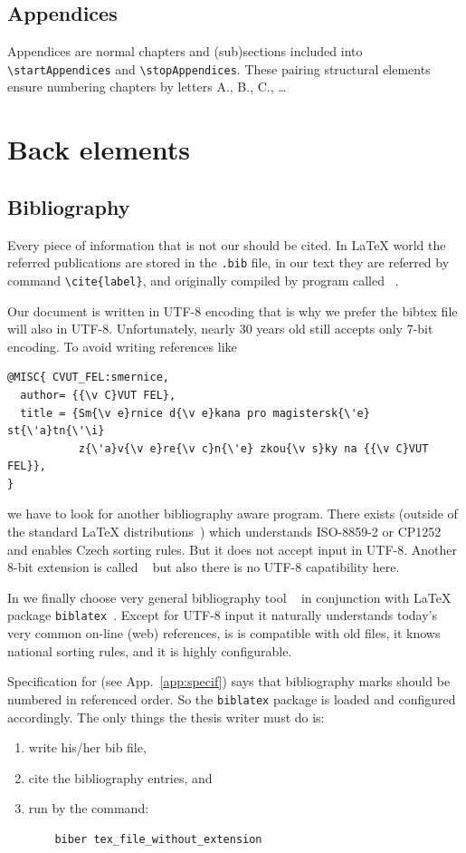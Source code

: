 \subsection{Appendices}
Appendices are normal chapters and (sub)sections included into \verb+\startAppendices+
and \verb+\stopAppendices+. These pairing structural elements ensure
numbering chapters by letters A., B., C., \dots

\section{Back elements}

\subsection{Bibliography}
Every piece of information that is not our should be cited. In \LaTeX{} world
the referred publications are stored in the \verb+.bib+ file, in our
text they are referred by command \verb+\cite{label}+, and originally compiled
by program called \BibTeX{}~\cite{Patashnik88a,bibtex}.

Our document is written in UTF-8 encoding that is why we prefer the bibtex
file will also in UTF-8. Unfortunately, nearly 30 years old \BibTeX{} still
accepts only 7-bit encoding. To avoid writing references like
\begin{verbatim}
@MISC{ CVUT_FEL:smernice,
  author= {{\v C}VUT FEL},
  title = {Sm{\v e}rnice d{\v e}kana pro magistersk{\'e} st{\'a}tn{\'\i}
           z{\'a}v{\v e}re{\v c}n{\'e} zkou{\v s}ky na {{\v C}VUT FEL}},
}
\end{verbatim}
we have to look for another bibliography aware program. There 
exists \CsBibtex{} (outside of the standard \LaTeX{}
distributions~\cite{csbibtex}) which understands ISO-8859-2 or CP1252
and enables Czech sorting rules. But it does not accept input in UTF-8. Another
8-bit extension is called \BibtexEight{}~\cite{bibtex8} but also there is no
UTF-8 capatibility here. 

In \FelThesis{} we finally choose very general bibliography tool
\Biber{}~\cite{biber} in conjunction with \LaTeX{} package
\verb+biblatex+~\cite{biblatex}. Except for UTF-8 input it naturally
understands today's very common on-line (web) references, is is compatible
with old \BibTeX{} files, it knows national sorting rules, and it is highly
configurable. 

Specification for \FelThesis{} (see App.~\ref{app:specif}) says that
bibliography marks should be 
numbered in referenced order. So the \verb+biblatex+ package is loaded
and configured accordingly. The only things the thesis writer must do is:
\begin{enumerate}
\item write his/her bib file,
\item cite the bibliography entries, and
\item run \Biber{} by the command:
  \begin{verbatim}
    biber tex_file_without_extension
  \end{verbatim}
\end{enumerate}

